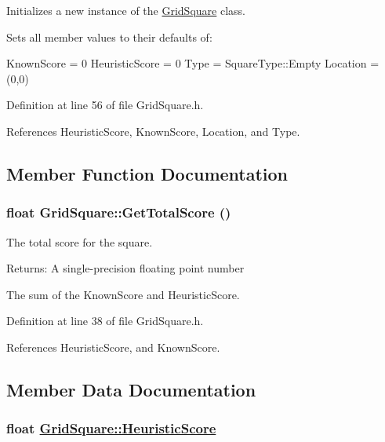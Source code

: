 Initializes a new instance of the \hyperlink{class_grid_square}{Grid\-Square} class. 

Sets all member values to their defaults of:

Known\-Score = 0 Heuristic\-Score = 0 Type = Square\-Type::Empty Location = (0,0) 

Definition at line 56 of file Grid\-Square.h.

References Heuristic\-Score, Known\-Score, Location, and Type.

\subsection{Member Function Documentation}
\hypertarget{class_grid_square_6fdbfeb74b4d71ab4c3a2c57e003ccce}{
\subsubsection[GetTotalScore]{\setlength{\rightskip}{0pt plus 5cm}float Grid\-Square::Get\-Total\-Score ()}}
\label{class_grid_square_6fdbfeb74b4d71ab4c3a2c57e003ccce}


The total score for the square. 

\begin{Desc}
\item[Returns:]A single-precision floating point number\end{Desc}
The sum of the Known\-Score and Heuristic\-Score. 

Definition at line 38 of file Grid\-Square.h.

References Heuristic\-Score, and Known\-Score.

\subsection{Member Data Documentation}
\hypertarget{class_grid_square_996fc2957740a41fa537e9c81ac6a9ac}{
\subsubsection[HeuristicScore]{\setlength{\rightskip}{0pt plus 5cm}float \hyperlink{class_grid_square_996fc2957740a41fa537e9c81ac6a9ac}{Grid\-Square::Heuristic\-Score}}}
\label{class_grid_square_996fc2957740a41fa537e9c81ac6a9ac}



